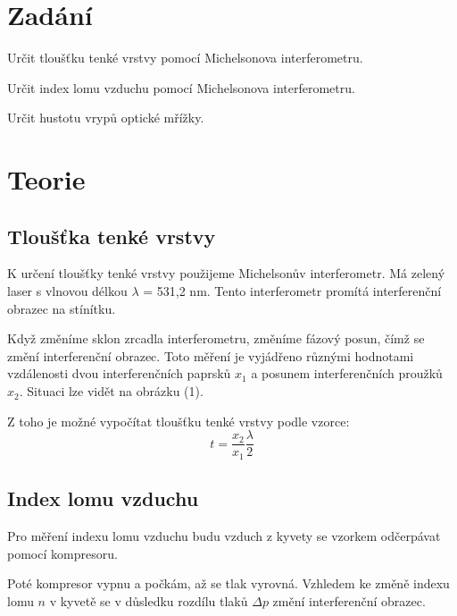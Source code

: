 \documentclass[a4paper,11pt]{article}
\begin{document}
\vskip1cm
    \begin{minipage}[t]{0.5\textwidth} 
        \section{Zadání}
            Určit tloušťku tenké vrstvy pomocí Michelsonova interferometru.
            \par Určit index lomu vzduchu pomocí Michelsonova interferometru. 
            \par Určit hustotu vrypů optické mřížky.
        \section{Teorie}
            \subsection{Tloušťka tenké vrstvy}
                K určení tloušťky tenké vrstvy použijeme Michelsonův interferometr. Má zelený laser s vlnovou délkou $\lambda$ = 531,2 nm. Tento interferometr promítá interferenční obrazec na stínítku.
                \par Když změníme sklon zrcadla interferometru, změníme fázový posun, čímž se změní interferenční obrazec. Toto měření je vyjádřeno různými hodnotami vzdálenosti dvou interferenčních paprsků $x_1$ a posunem interferenčních proužků $x_2$. Situaci lze vidět na obrázku (1).
                \par Z toho je možné vypočítat tloušťku tenké vrstvy podle vzorce:
                \begin{equation}
                    t = \frac{x_2}{x_1} \frac{\lambda}{2}
                \end{equation}
            \subsection{Index lomu vzduchu}
                \par Pro měření indexu lomu vzduchu budu vzduch z kyvety se vzorkem odčerpávat pomocí kompresoru.
                \par Poté kompresor vypnu a počkám, až se tlak vyrovná. Vzhledem ke změně indexu lomu $n$ v kyvetě se v důsledku rozdílu tlaků $\Delta p$ změní interferenční obrazec.
    \end{minipage}
    \hspace{10pt}
\end{document}
